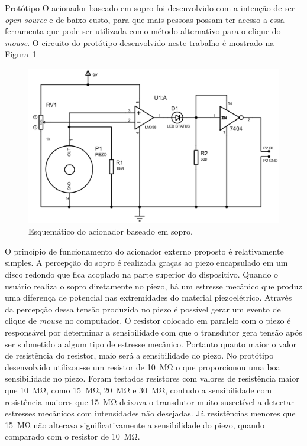 \begin{chapter}{Protótipo}
O acionador baseado em sopro foi desenvolvido com a intenção de ser
\textit{open-source} e de baixo custo, para que mais pessoas possam ter acesso
a essa ferramenta que pode ser utilizada como método alternativo para o clique
do \textit{mouse}. O circuito do protótipo desenvolvido neste trabalho é mostrado 
na Figura~\ref{fig:circuito}

\begin{figure}[!h]
	\centering
	\begin{minipage}[c]{\textwidth}
	\centering
	\includegraphics[width=0.9\linewidth]{fig/acionador}
	\caption{Esquemático do acionador baseado em sopro.}
	\label{fig:circuito}
	\end{minipage}
\end{figure} 

O princípio de funcionamento do acionador externo proposto é relativamente
simples. A percepção do sopro é realizada graças ao piezo encapsulado em um
disco redondo que fica acoplado na parte superior do dispositivo. Quando o
usuário realiza o sopro diretamente no piezo, há um estresse mecânico que produz
uma diferença de potencial nas extremidades do material piezoelétrico. Através
da percepção dessa tensão produzida no piezo é possível gerar um evento de
clique de \textit{mouse} no computador. O resistor colocado em paralelo com o
piezo é responsável por determinar a sensibilidade com que o transdutor gera
tensão após ser submetido a algum tipo de estresse mecânico. Portanto quanto
maior o valor de resistência do resistor, maio será a sensibilidade do piezo.
No protótipo desenvolvido utilizou-se um resistor de 10~M\si{\ohm} o que
proporcionou uma boa sensibilidade no piezo. Foram testados resistores com
valores de resistência maior que 10~M\si{\ohm}, como 15~M\si{\ohm}, 20~M\si{\ohm} e
30~M\si{\ohm}, contudo a sensibilidade com resistência maiores que 15~M\si{\ohm}
deixava o transdutor muito suscetível a detectar estresses mecânicos com
intensidades não desejadas. Já resistências menores que 15~M\si{\ohm} não
alterava significativamente a sensibilidade do piezo, quando comparado com o
resistor de 10~M\si{\ohm}. 


\end{chapter}
